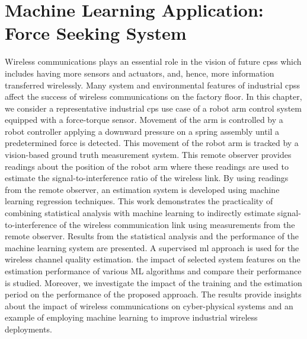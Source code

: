 
\chapter{Machine Learning Application: Force Seeking System}\label{chapter:ftml}

	
\chapterintro*

Wireless communications plays an essential role in the vision of future \glspl{cps} which includes having more sensors and actuators, and, hence, more information transferred wirelessly. Many system and environmental features of industrial \glspl{cps} affect the success of wireless communications on the factory floor. In this chapter, we consider a representative industrial \gls{cps} use case of a robot arm control system equipped with a force-torque sensor. Movement of the arm is controlled by a robot controller applying a downward pressure on a spring assembly until a predetermined force is detected. This movement of the robot arm is tracked by a vision-based ground truth measurement system. This remote observer provides readings about the position of the robot arm where these readings are used to estimate the signal-to-interference ratio of the wireless link. By using readings from the remote observer, an estimation system is developed using machine learning regression techniques.  This work demonstrates the practicality of combining statistical analysis with machine learning to indirectly estimate signal-to-interference of the wireless communication link using measurements from the remote observer.  Results from the statistical analysis and the performance of the machine learning system are presented.  A supervised \gls{ml} approach is used for the wireless channel quality estimation. the impact of selected system features on the estimation performance of various ML algorithms and compare their performance is studied.  Moreover, we investigate the impact of the training and the estimation period on the performance of the proposed approach. The results provide insights about the impact of wireless communications on cyber-physical systems and an example of employing machine learning to improve industrial wireless deployments. 


	
